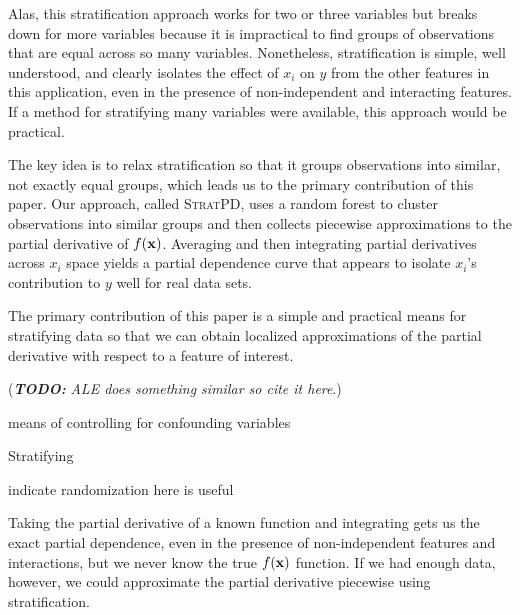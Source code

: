 \documentclass[12pt]{article}
\newcommand{\cut}[1]{}
\newcommand{\todo}[1]{{\bf\em TODO:} {\em #1}}
\newcommand{\spd}{\fontfamily{cmr}\textsc{\small StratPD}}
\begin{document}
Alas, this stratification approach works for two or three variables but breaks down for more variables because it is impractical to find groups of observations that are equal across so many variables.  Nonetheless, stratification is simple, well understood, and clearly isolates the effect of $x_i$ on $y$ from the other features in this application, even in the presence of non-independent and interacting features.  If a method for stratifying many variables were available, this approach would be practical.

The key idea is to relax stratification so that it groups observations into similar, not exactly equal groups, which leads us to the primary contribution of this paper.  Our approach, called \spd, uses a random forest to cluster observations into similar groups and then collects piecewise approximations to the partial derivative of $f(\bf x)$. Averaging and then integrating partial derivatives across $x_i$ space yields a partial dependence curve that appears to isolate $x_i$'s contribution to $y$ well for real data sets.

The primary contribution of this paper is a simple and practical means for stratifying data so that we can obtain localized approximations of the partial derivative with respect to a feature of interest.


(\todo{ALE does something similar so cite it here}.)

 means of controlling for confounding variables

Stratifying

indicate randomization here is useful

\cut{ 
$\{(x_i^{(g)}, y^{(g)})\}_{g=1}^G$
\\\\
$\{(x_i^{(g)}, y^{(g)})\}$
\\
\\
${\bf x} = [ x_1, .., x_d ]$ for $d$ dimensions/features?
\\
\\\\
$\{(x_i^{(k)}, y^{(k)})\}$ for $k$ in group $g$
\\
\\
}


Taking the partial derivative of a known function and integrating gets us the exact partial dependence, even in the presence of non-independent features and interactions, but we never know the true $f(\bf x)$ function.  If we had enough data, however, we could approximate the partial derivative piecewise using stratification.
\end{document}
